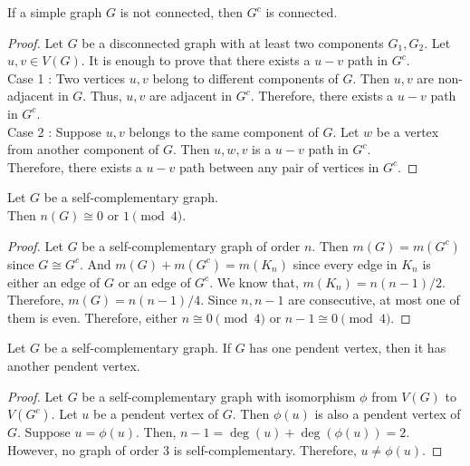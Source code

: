 \begin{theorem}
	If a simple graph $G$ is not connected, then $G^c$ is connected.
\end{theorem}
\begin{proof}
	Let $G$ be a disconnected graph with at least two components $G_1,G_2$.
	Let $u,v \in V(G)$. It is enough to prove that there exists a $u-v$ path in $G^c$.\\

	Case 1 : Two vertices $u,v$ belong to different components of $G$.
	Then $u,v$ are non-adjacent in $G$. Thus, $u,v$ are adjacent in $G^c$. Therefore, there exists a $u-v$ path in $G^c$.\\

	Case 2 : Suppose $u,v$ belongs to the same component of $G$. Let $w$ be a vertex from another component of $G$. Then $u,w,v$ is a $u-v$ path in $G^c$.\\

	Therefore, there exists a $u-v$ path between any pair of vertices in $G^c$.
\end{proof}

\begin{exercise}
	Let $G$ be a self-complementary graph.\\ Then $n(G) \cong 0 \text{ or } 1 \pmod{4}$.
\end{exercise}
\begin{proof}
	Let $G$ be a self-complementary graph of order $n$.
	Then $m(G) = m(G^c)$ since $G \cong G^c$.
	And $m(G)+m(G^c)= m(K_n)$ since every edge in $K_n$ is either an edge of $G$ or an edge of $G^c$.
	We know that, $m(K_n) = n(n-1)/2$.
	Therefore, $m(G) = n(n-1)/4$.
	Since $n,n-1$ are consecutive, at most one of them is even.
	Therefore, either $n \cong 0 \pmod{4}$ or $n-1 \cong 0 \pmod{4}$.
\end{proof}

\begin{exercise}
	Let $G$ be a self-complementary graph.
	If $G$ has one pendent vertex, then it has another pendent vertex.
\end{exercise}
\begin{proof}
	Let $G$ be a self-complementary graph with isomorphism $\phi$ from $V(G)$ to $V(G^c)$.
	Let $u$ be a pendent vertex of $G$.
	Then $\phi(u)$ is also a pendent vertex of $G$.
	Suppose $u = \phi(u)$. Then, $n-1 = \deg(u) + \deg(\phi(u)) = 2$. However, no graph of order $3$ is self-complementary.
	Therefore, $u \ne \phi(u)$.
\end{proof}

